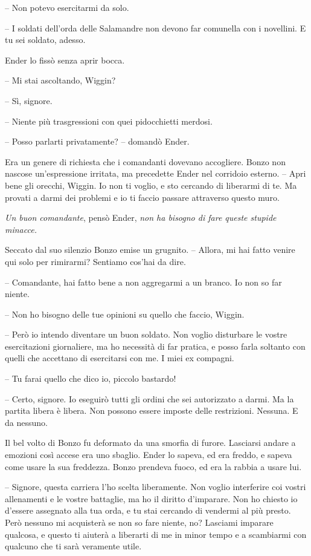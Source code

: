{-- Non potevo esercitarmi da solo.}

{-- I soldati dell'orda delle Salamandre non devono far comunella con i
	novellini. E tu sei soldato, adesso.}

{Ender lo fissò senza aprir bocca.}

{-- Mi stai ascoltando, Wiggin?}

{-- Sì, signore.}

{-- Niente più trasgressioni con quei pidocchietti merdosi.}

{-- Posso parlarti privatamente? -- domandò Ender.}

{Era un genere di richiesta che i comandanti dovevano accogliere. Bonzo
	non nascose un'espressione irritata, ma precedette Ender nel corridoio
	esterno. -- Apri bene gli orecchi, Wiggin. Io non ti voglio, e sto
	cercando di liberarmi di te. Ma provati a darmi dei problemi e io ti
	faccio passare attraverso questo muro.}

\emph{{Un buon comandante}}{, \emph{} pensò Ender, \emph{non ha bisogno
		di fare queste stupide minacce.}}

{Seccato dal suo silenzio Bonzo emise un grugnito. -- Allora, mi hai
	fatto venire qui solo per rimirarmi? Sentiamo cos'hai da dire.}

{-- Comandante, hai fatto bene a non aggregarmi a un branco. Io non so
	far niente.}

{-- Non ho bisogno delle tue opinioni su quello che faccio, Wiggin.}

{-- Però io intendo diventare un buon soldato. Non voglio disturbare le
	vostre esercitazioni giornaliere, ma ho necessità di far pratica, e
	posso farla soltanto con quelli che accettano di esercitarsi con me. I
	miei ex compagni.}

{-- Tu farai quello che dico io, piccolo bastardo!}

{-- Certo, signore. Io eseguirò tutti gli ordini che sei autorizzato a
	darmi. Ma la partita libera è libera. Non possono essere imposte delle
	restrizioni. Nessuna. E da nessuno.}

{Il bel volto di Bonzo fu deformato da una smorfia di furore. Lasciarsi
	andare a emozioni così accese era uno sbaglio. Ender lo sapeva, ed era
	freddo, e sapeva come usare la sua freddezza. Bonzo prendeva fuoco, ed
	era la rabbia a usare lui.}

{-- Signore, questa carriera l'ho scelta liberamente. Non voglio
	interferire coi vostri allenamenti e le vostre battaglie, ma ho il
	diritto d'imparare. Non ho chiesto io d'essere assegnato alla tua orda,
	e tu stai cercando di vendermi al più presto. Però nessuno mi acquisterà
	se non so fare niente, no? Lasciami imparare qualcosa, e questo ti
	aiuterà a liberarti di me in minor tempo e a scambiarmi con qualcuno che
	ti sarà veramente utile.}

